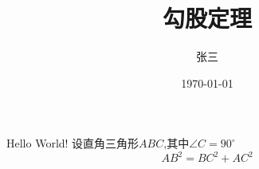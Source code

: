 \documentclass{article} %
\title{\heiti 勾股定理}
\author{\kaishu 张三}
\date{\today}
\newcommand\degree{^\circ}
\begin{document}
\maketitle
Hello World!
设直角三角形$ABC$,其中$\angle C=90\degree $
\begin{equation}    %
    AB^2 = BC^2 + AC^2
\end{equation}
\end{document}
